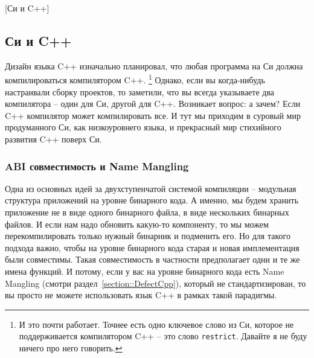 [Си и C++]


\subsection{Си и C++}

Дизайн языка C++ изначально планировал, что любая программа на Си должна компилироваться компилятором C++.%
\footnote{И это почти работает.
Точнее есть одно ключевое слово из Си, которое не поддерживается компилятором C++ -- это слово \texttt{restrict}.
Давайте я не буду ничего про него говорить.}
Однако, если вы когда-нибудь настраивали сборку проектов, то заметили, что вы всегда указываете два компилятора -- один для Си, другой для C++.
Возникает вопрос: а зачем?
Если C++ компилятор может компилировать все.
И тут мы приходим в суровый мир продуманного Си, как низкоуровнего языка, и прекрасный мир стихийного развития C++ поверх Си.

\subsubsection{ABI совместимость и Name Mangling}

Одна из основных идей за двухступенчатой системой компиляции -- модульная структура приложений на уровне бинарного кода.
А именно, мы будем хранить приложение не в виде одного бинарного файла, в виде нескольких бинарных файлов.
И если нам надо обновить какую-то компоненту, то мы можем перекомпилировать только нужный бинарник и подменить его.
Но для такого подхода важно, чтобы на уровне бинарного кода старая и новая имплементация были совместимы.
Такая совместимость в частности предполагает одни и те же имена функций.
И потому, если у вас на уровне бинарного кода есть Name Mangling (смотри раздел~\ref{section::DefectCpp}), который не стандартизирован, то вы просто не можете использовать язык C++ в рамках такой парадигмы.

